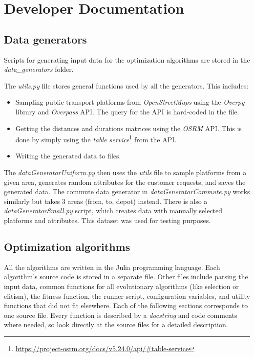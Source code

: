 \chapter{Developer Documentation}\label{app:devel}

\section{Data generators}

Scripts for generating input data for the optimization algorithms are stored in the \textit{data\_generators} folder.

The \textit{utils.py} file stores general functions used by all the generators. This includes:
\begin{itemize}
    \setlength\itemsep{0pt}
    \item Sampling public transport platforms from \textit{OpenStreetMaps} using the \textit{Overpy} library and \textit{Overpass} API. The query for the API is hard-coded in the file. 
    \item Getting the distances and durations matrices using the \textit{OSRM} API. This is done by simply using the \textit{table service}\footnote{\url{https://project-osrm.org/docs/v5.24.0/api/\#table-service}} from the API.
    \item Writing the generated data to files.
\end{itemize}

The \textit{dataGeneratorUniform.py} then uses the \textit{utils} file to sample platforms from a given area, generates random attributes for the customer requests, and saves the generated data. The commute data generator in \textit{dataGeneratorCommute.py} works similarly but takes 3 areas (from, to, depot) instead. There is also a \textit{dataGeneratorSmall.py} script, which creates data with manually selected platforms and attributes. This dataset was used for testing purposes.

\section{Optimization algorithms}

All the algorithms are written in the Julia programming language. Each algorithm's source code is stored in a separate file. Other files include parsing the input data, common functions for all evolutionary algorithms (like selection or elitism), the fitness function, the runner script, configuration variables, and utility functions that did not fit elsewhere. Each of the following sections corresponds to one source file. Every function is described by a \textit{docstring} and code comments where needed, so look directly at the source files for a detailed description.

